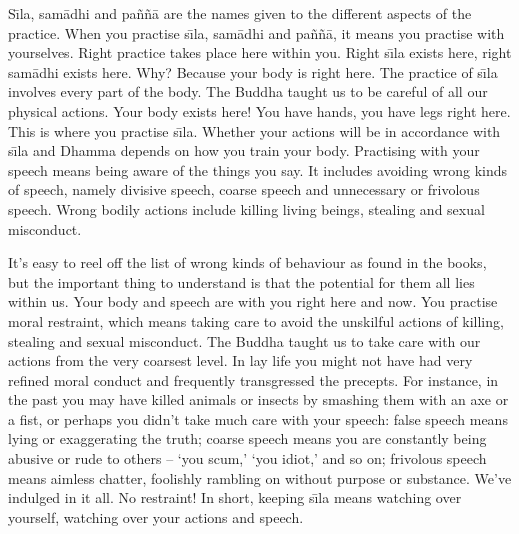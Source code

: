 S\={\i}la, sam\=adhi and pa\~n\~n\=a are the names given to the different aspects of the practice. When you practise s\={\i}la, sam\=adhi and pa\~n\~n\=a, it means you practise with yourselves. Right practice takes place here within you. Right s\={\i}la exists here, right sam\=adhi exists here. Why? Because your body is right here. The practice of s\={\i}la involves every part of the body. The Buddha taught us to be careful of all our physical actions. Your body exists here! You have hands, you have legs right here. This is where you practise s\={\i}la. Whether your actions will be in accordance with s\={\i}la and Dhamma depends on how you train your body. Practising with your speech means being aware of the things you say. It includes avoiding wrong kinds of speech, namely divisive speech, coarse speech and unnecessary or frivolous speech. Wrong bodily actions include killing living beings, stealing and sexual misconduct.

It's easy to reel off the list of wrong kinds of behaviour as found in the books, but the important thing to understand is that the potential for them all lies within us. Your body and speech are with you right here and now. You practise moral restraint, which means taking care to avoid the unskilful actions of killing, stealing and sexual misconduct. The Buddha taught us to take care with our actions from the very coarsest level. In lay life you might not have had very refined moral conduct and frequently transgressed the precepts. For instance, in the past you may have killed animals or insects by smashing them with an axe or a fist, or perhaps you didn't take much care with your speech: false speech means lying or exaggerating the truth; coarse speech means you are constantly being abusive or rude to others -- `you scum,' `you idiot,' and so on; frivolous speech means aimless chatter, foolishly rambling on without purpose or substance. We've indulged in it all. No restraint! In short, keeping s\={\i}la means watching over yourself, watching over your actions and speech.

